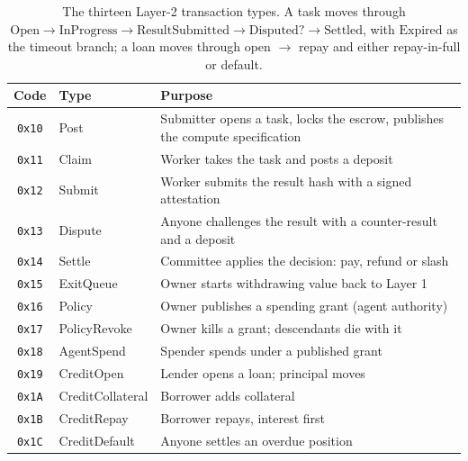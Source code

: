 \documentclass{article}
\begin{document}
\begin{table}[htbp]
\centering
\begin{tabular}{cll}
\toprule
\textbf{Code} & \textbf{Type} & \textbf{Purpose} \\
\midrule
\texttt{0x10} & Post & Submitter opens a task, locks the escrow, publishes the
  compute specification \\
\texttt{0x11} & Claim & Worker takes the task and posts a deposit \\
\texttt{0x12} & Submit & Worker submits the result hash with a signed
  attestation \\
\texttt{0x13} & Dispute & Anyone challenges the result with a counter-result
  and a deposit \\
\texttt{0x14} & Settle & Committee applies the decision: pay, refund or slash \\
\texttt{0x15} & ExitQueue & Owner starts withdrawing value back to Layer 1 \\
\texttt{0x16} & Policy & Owner publishes a spending grant (agent authority) \\
\texttt{0x17} & PolicyRevoke & Owner kills a grant; descendants die with it \\
\texttt{0x18} & AgentSpend & Spender spends under a published grant \\
\texttt{0x19} & CreditOpen & Lender opens a loan; principal moves \\
\texttt{0x1A} & CreditCollateral & Borrower adds collateral \\
\texttt{0x1B} & CreditRepay & Borrower repays, interest first \\
\texttt{0x1C} & CreditDefault & Anyone settles an overdue position \\
\bottomrule
\end{tabular}
\caption{The thirteen Layer-2 transaction types. A task moves through
$\text{Open} \rightarrow \text{InProgress} \rightarrow \text{ResultSubmitted}
\rightarrow \text{Disputed?} \rightarrow \text{Settled}$, with $\text{Expired}$
as the timeout branch; a loan moves through open $\rightarrow$ repay and either
repay-in-full or default.}
\label{tab:l2types}
\end{table}
\end{document}
